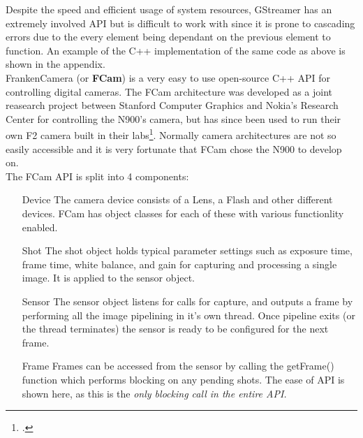 Despite the speed and efficient usage of system resources, GStreamer has an extremely involved API but is difficult to work with since it is prone to cascading errors due to the every element being dependant on the previous element to function. An example of the C++ implementation of the same code as above is shown in the appendix.\\

FrankenCamera (or {\bf FCam}) is a very easy to use open-source C++ API for controlling digital cameras.  The FCam architecture was developed as a joint reasearch project between Stanford Computer Graphics and Nokia's Research Center for controlling the N900's camera, but has since been used to run their own F2 camera built in their labs\footcite{fcamdoc}. Normally camera architectures are not so easily accessible and it is very fortunate that FCam chose the N900 to develop on.
\pagebreak
\\The FCam API is split into 4 components:
\begin{enumerate}
\item[Device]{The camera device consists of a Lens, a Flash and other different devices. FCam has object classes for each of these with various functionlity enabled.}
\item[Shot]{The shot object holds typical parameter settings such as exposure time, frame time, white balance, and gain for capturing and processing a single image. It is applied to the sensor object.}
\item[Sensor]{The sensor object listens for calls for capture, and outputs a frame by performing all the image pipelining in it's own thread. Once pipeline exits (or the thread terminates) the sensor is ready to be configured for the next frame.}
\item[Frame]{Frames can be accessed from the sensor by calling the getFrame() function which performs blocking on any pending shots. The ease of API is shown here, as this is the \it{only} blocking call in the entire API.}
\end{enumerate}

